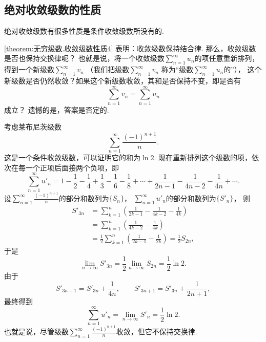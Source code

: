\subsection{绝对收敛级数的性质}
绝对收敛级数有很多性质是条件收敛级数所没有的.

\cref{theorem:无穷级数.收敛级数性质4} 表明：收敛级数保持结合律.
那么，收敛级数是否也保持交换律呢？
也就是说，将一个收敛级数\(\sum_{n=1}^\infty u_n\)的项任意重新排列，
得到一个新级数\(\sum_{n=1}^\infty v_n\)
（我们把级数\(\sum_{n=1}^\infty v_n\)
称为“级数\(\sum_{n=1}^\infty u_n\)的”），
这个新级数是否仍然收敛？如果这个新级数收敛，其和是否保持不变，即是否有\begin{equation*}
	\sum_{n=1}^\infty v_n = \sum_{n=1}^\infty u_n
\end{equation*}成立？
遗憾的是，答案是否定的.

考虑莱布尼茨级数\begin{equation*}
	\sum_{n=1}^\infty \frac{(-1)^{n+1}}n.
\end{equation*}
这是一个条件收敛级数，可以证明它的和为\(\ln2\).
现在重新排列这个级数的项，依次在每一个正项后面接两个负项，即\begin{equation*}
	\sum_{n=1}^\infty u'_n
	= 1 - \frac12 - \frac14
	+ \frac13 - \frac16 - \frac18
	+ \dotsb
	+ \frac1{2n-1} - \frac1{4n-2} - \frac1{4n}
	+ \dotsb.
\end{equation*}
设\(\sum_{n=1}^\infty \frac{(-1)^{n+1}}n\)的部分和数列为\(\{S_n\}\)，
\(\sum_{n=1}^\infty u'_n\)的部分和数列为\(\{S'_n\}\)，
则\begin{align*}
	S'_{3n}
	&= \sum_{k=1}^n \left(
		\frac1{2k-1} - \frac1{4k-2} - \frac1{4k}
	\right) \\
	&= \sum_{k=1}^n \left(
		\frac1{4k-2} - \frac1{4k}
	\right) \\
	&= \frac12 \sum_{k=1}^n \left(
		\frac1{2k-1} - \frac1{2k}
	\right)
	= \frac12 S_{2n},
\end{align*}
于是\begin{equation*}
	\lim_{n\to\infty} S'_{3n}
	= \frac12 \lim_{n\to\infty} S_{2n}
	= \frac12 \ln 2.
\end{equation*}
由于\begin{equation*}
	S'_{3n-1} = S'_{3n} + \frac1{4n},
	\qquad
	S'_{3n+1} = S'_{3n} + \frac1{2n+1},
\end{equation*}
最终得到\begin{equation*}
	\sum_{n=1}^\infty u'_n
	= \lim_{n\to\infty} S'_n
	= \frac12 \ln 2.
\end{equation*}
也就是说，尽管级数\(\sum_{n=1}^\infty \frac{(-1)^{n+1}}n\)收敛，但它不保持交换律.


